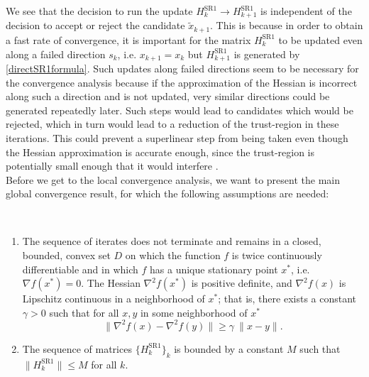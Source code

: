 We see that the decision to run the update $H^{\mathrm{SR1}}_k \rightarrow H^{\mathrm{SR1}}_{k+1}$ is independent of the decision to accept or reject the candidate $\widetilde{x}_{k+1}$. This is because in order to obtain a fast rate of convergence, it is important for the matrix $H^{\mathrm{SR1}}_k$ to be updated even along a failed direction $s_k$, i.e. $x_{k+1} = x_k$ but $H^{\mathrm{SR1}}_{k+1}$ is generated by \cref{directSR1formula}. Such updates along failed directions seem to be necessary for the convergence analysis because if the approximation of the Hessian is incorrect along such a direction and is not updated, very similar directions could be generated repeatedly later. Such steps would lead to candidates which would be rejected, which in turn would lead to a reduction of the trust-region in these iterations. This could prevent a superlinear step from being taken even though the Hessian approximation is accurate enough, since the trust-region is potentially small enough that it would interfere \cite[p.~1028]{ByrdKhalfanSchnabel:1996}. \\
Before we get to the local convergence analysis, we want to present the main global convergence result, for which the following assumptions are needed:

\begin{assumption}\label{AssumptionsGlobalConvergence} \ \\[-1.5\baselineskip]
    \begin{enumerate}
        \item The sequence of iterates does not terminate and remains in a closed, bounded, convex set $D$ on which the function $f$ is twice continuously differentiable and in which $f$ has a unique stationary point $x^*$, i.e. $\nabla f(x^*) = 0$. The Hessian $\nabla^2 f(x^*)$ is positive definite, and $\nabla^2 f(x)$ is Lipschitz continuous in a neighborhood of $x^*$; that is, there exists a constant $\gamma > 0$ such that for all $x, y$ in some neighborhood of $x^*$ \begin{equation*} \lVert \nabla^2 f(x) - \nabla^2 f(y) \rVert \geq \gamma \ \lVert x - y \rVert. \end{equation*}
        \item The sequence of matrices $\{ H^{\mathrm{SR1}}_k \}_k$ is bounded by a constant $M$ such that $\lVert H^{\mathrm{SR1}}_k \rVert \leq M$ for all $k$.
    \end{enumerate}
\end{assumption}

